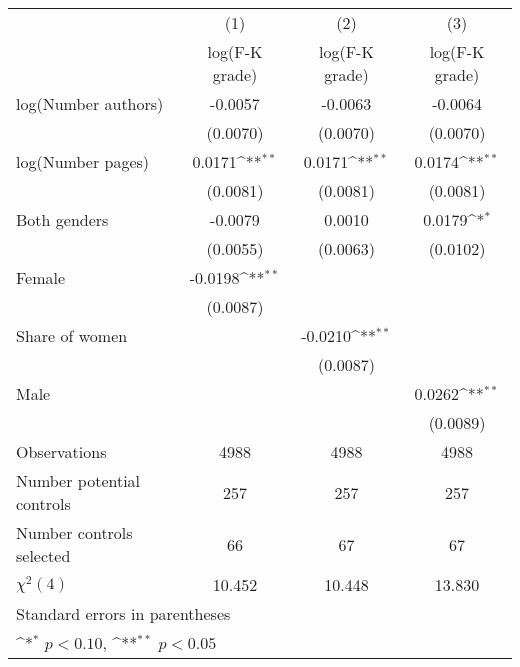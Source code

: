 {
\def\sym#1{\ifmmode^{#1}\else\(^{#1}\)\fi}
\begin{tabular}{l*{3}{c}}
\hline\hline
                    &\multicolumn{1}{c}{(1)}&\multicolumn{1}{c}{(2)}&\multicolumn{1}{c}{(3)}\\
                    &\multicolumn{1}{c}{log(F-K grade)}&\multicolumn{1}{c}{log(F-K grade)}&\multicolumn{1}{c}{log(F-K grade)}\\
\hline
\hspace{3mm}log(Number authors)&     -0.0057        &     -0.0063        &     -0.0064        \\
                    &    (0.0070)        &    (0.0070)        &    (0.0070)        \\
[1em]
\hspace{3mm}log(Number pages)&      0.0171\sym{**}&      0.0171\sym{**}&      0.0174\sym{**}\\
                    &    (0.0081)        &    (0.0081)        &    (0.0081)        \\
[1em]
\hspace{3mm}Both genders&     -0.0079        &      0.0010        &      0.0179\sym{*} \\
                    &    (0.0055)        &    (0.0063)        &    (0.0102)        \\
[1em]
\hspace{3mm}Female  &     -0.0198\sym{**}&                    &                    \\
                    &    (0.0087)        &                    &                    \\
[1em]
\hspace{3mm}Share of women&                    &     -0.0210\sym{**}&                    \\
                    &                    &    (0.0087)        &                    \\
[1em]
\hspace{3mm}Male    &                    &                    &      0.0262\sym{**}\\
                    &                    &                    &    (0.0089)        \\
\hline
Observations        &        4988        &        4988        &        4988        \\
Number potential controls&         257        &         257        &         257        \\
Number controls selected&          66        &          67        &          67        \\
$\chi^2(4)$         &      10.452        &      10.448        &      13.830        \\
\hline\hline
\multicolumn{4}{l}{\footnotesize Standard errors in parentheses}\\
\multicolumn{4}{l}{\footnotesize \sym{*} \(p<0.10\), \sym{**} \(p<0.05\)}\\
\end{tabular}
}
